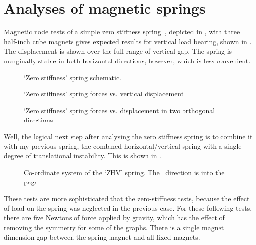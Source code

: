 \section{Analyses of magnetic springs}

Magnetic node tests of a simple zero stiffness
spring~\cite{nijsse2001}, depicted in
, with three half-inch cube magnets
gives expected results for vertical load bearing, shown in
. The displacement is shown over the full
range of vertical gap. The spring is marginally stable in both
horizontal directions, however, which is less convenient.
\begin{figure}
  \centering
  \caption{`Zero stiffness' spring schematic.}
\end{figure}

\begin{figure}
  \centering
  \caption{`Zero stiffness' spring forces vs. vertical displacement}
\end{figure}

\begin{figure}
  \centering
  \caption{`Zero stiffness' spring forces vs. displacement in two orthogonal directions}
\end{figure}



Well, the logical next step after analysing the zero stiffness spring
is to combine it with my previous spring, the combined
horizontal/vertical spring with a single degree of translational
instability. This is shown in .

\begin{figure}
   \centering
   \caption{Co-ordinate system of the `ZHV' spring. The \y\ direction is into the page.}
\end{figure}

These tests are more sophisticated that the zero-stiffness tests,
because the effect of load on the spring was neglected in the previous
case. For these following tests, there are five Newtons of force
applied by gravity, which has the effect of removing the symmetry for
some of the graphs. There is a single magnet dimension gap between the
spring magnet and all fixed magnets.

